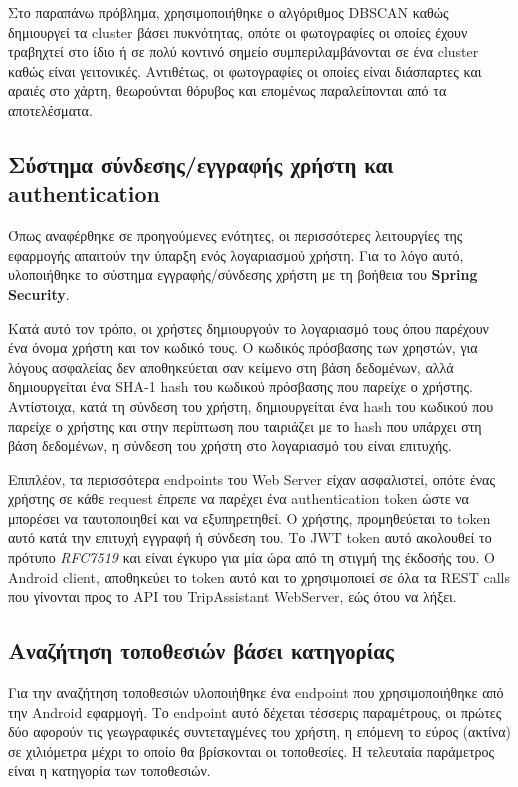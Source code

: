 \documentclass[oneside, 12pt]{book}
\begin{document}
Στο παραπάνω πρόβλημα, χρησιμοποιήθηκε ο αλγόριθμος DBSCAN καθώς 
δημιουργεί τα cluster βάσει πυκνότητας, οπότε οι φωτογραφίες οι 
οποίες έχουν τραβηχτεί στο ίδιο ή σε πολύ κοντινό σημείο 
συμπεριλαμβάνονται σε ένα cluster καθώς είναι γειτονικές. Αντιθέτως, 
οι φωτογραφίες οι οποίες είναι διάσπαρτες και αραιές στο χάρτη, 
θεωρούνται θόρυβος και επομένως παραλείπονται από τα αποτελέσματα.

\subsection{Σύστημα σύνδεσης/εγγραφής χρήστη και authentication}
Όπως αναφέρθηκε σε προηγούμενες ενότητες, οι περισσότερες λειτουργίες 
της εφαρμογής απαιτούν την ύπαρξη ενός λογαριασμού χρήστη.
Για το λόγο αυτό, υλοποιήθηκε το σύστημα εγγραφής/σύνδεσης χρήστη με 
τη βοήθεια του \textbf{Spring Security}. 

Κατά αυτό τον τρόπο, οι χρήστες δημιουργούν το λογαριασμό τους όπου 
παρέχουν ένα όνομα χρήστη και τον κωδικό τους. Ο κωδικός πρόσβασης 
των χρηστών, για λόγους ασφαλείας δεν αποθηκεύεται σαν κείμενο στη 
βάση δεδομένων, αλλά δημιουργείται ένα SHA-1 hash του κωδικού 
πρόσβασης που παρείχε ο χρήστης. Αντίστοιχα, κατά τη σύνδεση του 
χρήστη, δημιουργείται ένα hash του κωδικού που παρείχε ο χρήστης και 
στην περίπτωση που ταιριάζει με το hash που υπάρχει στη βάση 
δεδομένων, η σύνδεση του χρήστη στο λογαριασμό του είναι επιτυχής. 

Επιπλέον, τα περισσότερα endpoints του Web Server είχαν ασφαλιστεί, 
οπότε ένας χρήστης σε κάθε request έπρεπε να παρέχει ένα 
authentication token ώστε να μπορέσει να ταυτοποιηθεί και να 
εξυπηρετηθεί. Ο χρήστης, προμηθεύεται το token αυτό κατά την επιτυχή εγγραφή ή σύνδεση του. Το JWT token αυτό ακολουθεί το πρότυπο \textit{RFC7519} και είναι έγκυρο για μία ώρα από τη στιγμή της έκδοσής του. Ο Android client, αποθηκεύει το token αυτό και το χρησιμοποιεί σε όλα τα REST calls που γίνονται προς το API του TripAssistant WebServer, εώς ότου να λήξει.

\subsection{Αναζήτηση τοποθεσιών βάσει κατηγορίας}\label{sec:search_places_by_category_tech_analysis}
Για την αναζήτηση τοποθεσιών υλοποιήθηκε ένα endpoint που χρησιμοποιήθηκε από την Android εφαρμογή. Το endpoint αυτό δέχεται τέσσερις παραμέτρους, οι πρώτες δύο αφορούν τις γεωγραφικές συντεταγμένες του χρήστη, η επόμενη το εύρος (ακτίνα) σε χιλιόμετρα μέχρι το οποίο θα βρίσκονται οι τοποθεσίες. Η τελευταία παράμετρος είναι η κατηγορία των τοποθεσιών.
\end{document}

